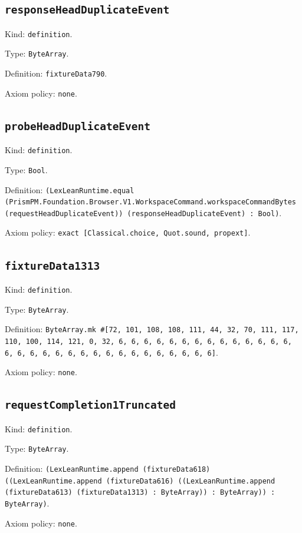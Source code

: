 \documentclass[11pt]{article}
\begin{document}
\subsection*{\texttt{responseHeadDuplicateEvent}}
\noindent Kind: \texttt{definition}.\par
\noindent Type: \texttt{ByteArray}.\par
\noindent Definition: \texttt{fixtureData790}.\par
\noindent Axiom policy: \texttt{none}.\par
\subsection*{\texttt{probeHeadDuplicateEvent}}
\noindent Kind: \texttt{definition}.\par
\noindent Type: \texttt{Bool}.\par
\noindent Definition: \texttt{(LexLeanRuntime.equal (PrismPM.Foundation.Browser.V1.WorkspaceCommand.workspaceCommandBytes (requestHeadDuplicateEvent)) (responseHeadDuplicateEvent) : Bool)}.\par
\noindent Axiom policy: \texttt{exact [Classical.choice, Quot.sound, propext]}.\par
\subsection*{\texttt{fixtureData1313}}
\noindent Kind: \texttt{definition}.\par
\noindent Type: \texttt{ByteArray}.\par
\noindent Definition: \texttt{ByteArray.mk \#[72, 101, 108, 108, 111, 44, 32, 70, 111, 117, 110, 100, 114, 121, 0, 32, 6, 6, 6, 6, 6, 6, 6, 6, 6, 6, 6, 6, 6, 6, 6, 6, 6, 6, 6, 6, 6, 6, 6, 6, 6, 6, 6, 6, 6, 6, 6]}.\par
\noindent Axiom policy: \texttt{none}.\par
\subsection*{\texttt{requestCompletion1Truncated}}
\noindent Kind: \texttt{definition}.\par
\noindent Type: \texttt{ByteArray}.\par
\noindent Definition: \texttt{(LexLeanRuntime.append (fixtureData618) ((LexLeanRuntime.append (fixtureData616) ((LexLeanRuntime.append (fixtureData613) (fixtureData1313) : ByteArray)) : ByteArray)) : ByteArray)}.\par
\noindent Axiom policy: \texttt{none}.\par
\end{document}
